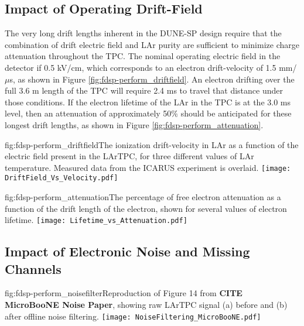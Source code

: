 \subsection{Impact of Operating Drift-Field}
\label{sec:fdsp-perform-drift}

The very long drift lengths inherent in the DUNE-SP design require that the combination of drift electric field and LAr purity are sufficient to minimize charge attenuation throughout the TPC.  The nominal operating electric field in the detector if 0.5 kV/cm, which corresponds to an electron drift-velocity of 1.5 mm/$\mu$s, as shown in Figure \ref{fig:fdsp-perform_driftfield}.  An electron drifting over the full 3.6 m length of the TPC will require 2.4 ms to travel that distance under those conditions.  If the electron lifetime of the LAr in the TPC is at the 3.0 ms level, then an attenuation of approximately 50$\%$ should be anticipated for these longest drift lengths, as shown in Figure \ref{fig:fdsp-perform_attenuation}.


\begin{dunefigure}{fig:fdsp-perform_driftfield}{The ionization drift-velocity in LAr as a function of the electric field present in the LArTPC, for three different values of LAr temperature.  Measured data from the ICARUS experiment is overlaid.}
\texttt{[image: DriftField\_Vs\_Velocity.pdf]}
\end{dunefigure}

\begin{dunefigure}{fig:fdsp-perform_attenuation}{The percentage of free electron attenuation as a function  of the drift length of the electron, shown for several values of electron lifetime.}
\texttt{[image: Lifetime\_vs\_Attenuation.pdf]}
\end{dunefigure}

\subsection{Impact of Electronic Noise and Missing Channels}
\label{sec:fdsp-perform-noise}

\begin{dunefigure}{fig:fdsp-perform_noisefilter}{Reproduction of Figure 14 from \textbf{CITE MicroBooNE Noise Paper}, showing raw LArTPC signal (a) before and (b) after offline noise filtering.}
\texttt{[image: NoiseFiltering\_MicroBooNE.pdf]}
\end{dunefigure}
